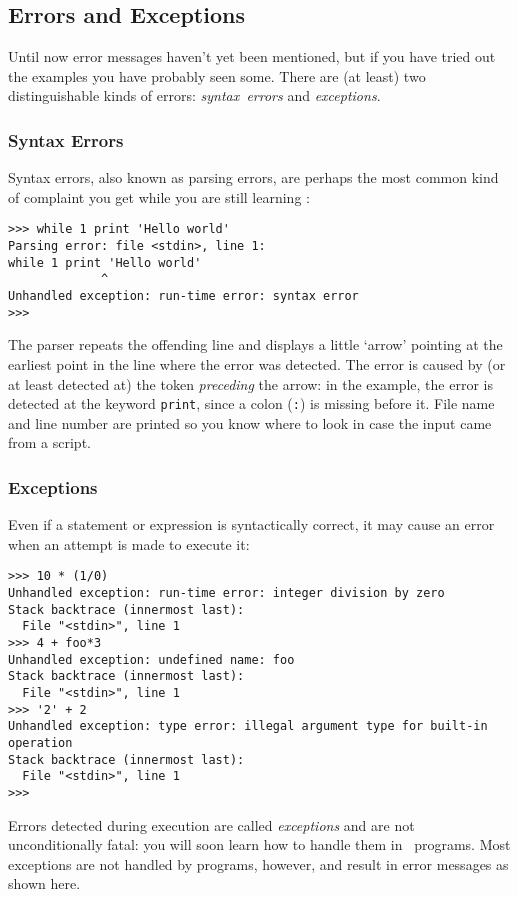 \subsection{Errors and Exceptions}

Until now error messages haven't yet been mentioned, but if you have
tried out the examples you have probably seen some.
There are (at least) two distinguishable kinds of errors:
{\em syntax\ errors}
and
{\em exceptions}.

\subsubsection{Syntax Errors}

Syntax errors, also known as parsing errors, are perhaps the most common
kind of complaint you get while you are still learning \Python:
\bcode\begin{verbatim}
>>> while 1 print 'Hello world'
Parsing error: file <stdin>, line 1:
while 1 print 'Hello world'
             ^
Unhandled exception: run-time error: syntax error
>>>
\end{verbatim}\ecode
The parser repeats the offending line and displays a little `arrow'
pointing at the earliest point in the line where the error was detected.
The error is caused by (or at least detected at) the token
{\em preceding}
the arrow: in the example, the error is detected at the keyword
{\tt print}, since a colon ({\tt :}) is missing before it.
File name and line number are printed so you know where to look in case
the input came from a script.

\subsubsection{Exceptions}

Even if a statement or expression is syntactically correct, it may cause
an error when an attempt is made to execute it:
\bcode\small\begin{verbatim}
>>> 10 * (1/0)
Unhandled exception: run-time error: integer division by zero
Stack backtrace (innermost last):
  File "<stdin>", line 1
>>> 4 + foo*3
Unhandled exception: undefined name: foo
Stack backtrace (innermost last):
  File "<stdin>", line 1
>>> '2' + 2
Unhandled exception: type error: illegal argument type for built-in operation
Stack backtrace (innermost last):
  File "<stdin>", line 1
>>>
\end{verbatim}\ecode
Errors detected during execution are called
{\em exceptions}
and are not unconditionally fatal: you will soon learn how to handle
them in \Python\ programs.
Most exceptions are not handled by programs, however, and result
in error messages as shown here.

